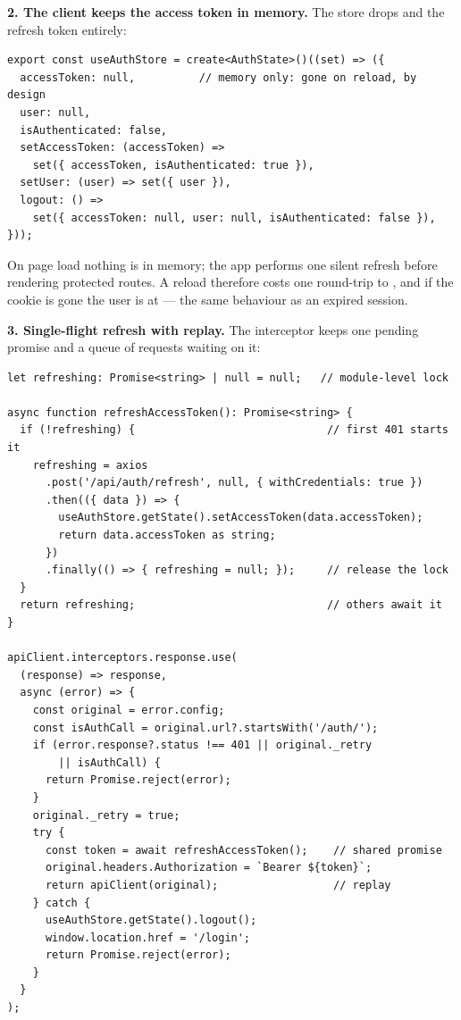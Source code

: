 \textbf{2. The client keeps the access token in memory.} The store
drops  and the refresh token entirely:

\begin{lstlisting}
export const useAuthStore = create<AuthState>()((set) => ({
  accessToken: null,          // memory only: gone on reload, by design
  user: null,
  isAuthenticated: false,
  setAccessToken: (accessToken) =>
    set({ accessToken, isAuthenticated: true }),
  setUser: (user) => set({ user }),
  logout: () =>
    set({ accessToken: null, user: null, isAuthenticated: false }),
}));
\end{lstlisting}

On page load nothing is in memory; the app performs one silent refresh
before rendering protected routes. A reload therefore costs one
round-trip to , and if the cookie is gone the
user is at  --- the same behaviour as an expired session.

\textbf{3. Single-flight refresh with replay.} The interceptor keeps
one pending promise and a queue of requests waiting on it:

\begin{lstlisting}
let refreshing: Promise<string> | null = null;   // module-level lock

async function refreshAccessToken(): Promise<string> {
  if (!refreshing) {                              // first 401 starts it
    refreshing = axios
      .post('/api/auth/refresh', null, { withCredentials: true })
      .then(({ data }) => {
        useAuthStore.getState().setAccessToken(data.accessToken);
        return data.accessToken as string;
      })
      .finally(() => { refreshing = null; });     // release the lock
  }
  return refreshing;                              // others await it
}

apiClient.interceptors.response.use(
  (response) => response,
  async (error) => {
    const original = error.config;
    const isAuthCall = original.url?.startsWith('/auth/');
    if (error.response?.status !== 401 || original._retry
        || isAuthCall) {
      return Promise.reject(error);
    }
    original._retry = true;
    try {
      const token = await refreshAccessToken();    // shared promise
      original.headers.Authorization = `Bearer ${token}`;
      return apiClient(original);                  // replay
    } catch {
      useAuthStore.getState().logout();
      window.location.href = '/login';
      return Promise.reject(error);
    }
  }
);
\end{lstlisting}

